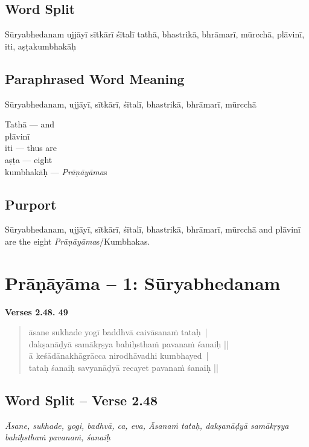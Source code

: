 \subsection*{Word Split}

Sūryabhedanam ujjāyī sītkārī śītalī tathā, bhastrikā, bhrāmarī, mūrcchā, plāvinī, iti, aṣṭakumbhakāḥ

\subsection*{Paraphrased Word Meaning}


Sūryabhedanam, ujjāyī, sītkārī, śītalī, bhastrikā, bhrāmarī, mūrcchā

\begin{multicols}{2}
Tathā --- and \\
plāvinī  \\
iti  --- thus are \\
aṣṭa --- eight \\
kumbhakāḥ --- \textit{Prāṇāyāma}s 
\end{multicols}

\subsection*{Purport}

Sūryabhedanam, ujjāyī, sītkārī, śītalī, bhastrikā, bhrāmarī, mūrcchā and plāvinī are the eight \textit{Prāṇāyāma}s/Kumbhakas.	
\newpage

\section*{Prāṇāyāma -- 1: Sūryabhedanam}

\noindent \textbf{Verses 2.48. 49}

\begin{verse}
āsane sukhade yogī baddhvā caivāsanaṁ tataḥ |\\
dakṣanāḍyā samākṛṣya bahiḥsthaṁ pavanaṁ śanaiḥ ||\\
ā keśādānakhāgrācca nirodhāvadhi kumbhayed |\\
tataḥ śanaiḥ savyanāḍyā recayet pavanaṁ śanaiḥ ||
\end{verse}

\subsection*{Word Split -- Verse 2.48}

\textit{Āsane, sukhade, yogi, badhvā, ca, eva, \textit{Āsana}ṁ tataḥ, dakṣanāḍyā samākṛṣya bahiḥsthaṁ pavanaṁ, śanaiḥ}

